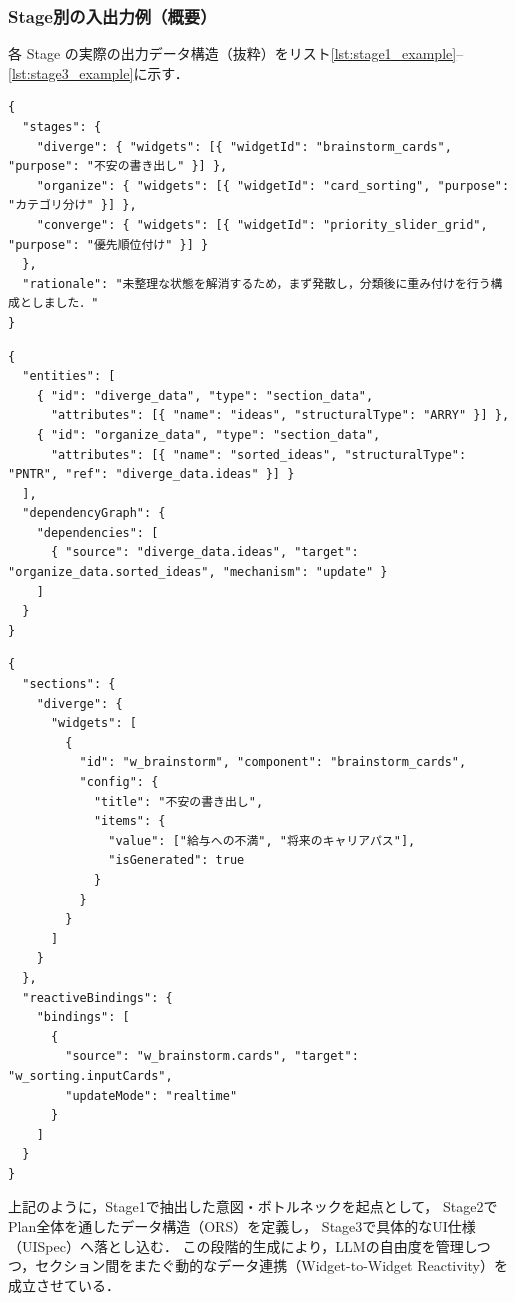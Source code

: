 \documentclass[a4paper,10pt]{jarticle}
\begin{document}
\subsubsection{Stage別の入出力例（概要）}
各 Stage の実際の出力データ構造（抜粋）をリスト\ref{lst:stage1_example}--\ref{lst:stage3_example}に示す．

\begin{lstlisting}[caption = Stage1出力例：WidgetSelectionResult（JSON）, label = lst:stage1_example]
{
  "stages": {
    "diverge": { "widgets": [{ "widgetId": "brainstorm_cards", "purpose": "不安の書き出し" }] },
    "organize": { "widgets": [{ "widgetId": "card_sorting", "purpose": "カテゴリ分け" }] },
    "converge": { "widgets": [{ "widgetId": "priority_slider_grid", "purpose": "優先順位付け" }] }
  },
  "rationale": "未整理な状態を解消するため，まず発散し，分類後に重み付けを行う構成としました．"
}
\end{lstlisting}

\begin{lstlisting}[caption = Stage2出力例：Integrated ORS（JSON）, label = lst:stage2_example]
{
  "entities": [
    { "id": "diverge_data", "type": "section_data", 
      "attributes": [{ "name": "ideas", "structuralType": "ARRY" }] },
    { "id": "organize_data", "type": "section_data",
      "attributes": [{ "name": "sorted_ideas", "structuralType": "PNTR", "ref": "diverge_data.ideas" }] }
  ],
  "dependencyGraph": {
    "dependencies": [
      { "source": "diverge_data.ideas", "target": "organize_data.sorted_ideas", "mechanism": "update" }
    ]
  }
}
\end{lstlisting}

\begin{lstlisting}[caption = Stage3出力例：Integrated UISpec（JSON）, label = lst:stage3_example]
{
  "sections": {
    "diverge": {
      "widgets": [
        {
          "id": "w_brainstorm", "component": "brainstorm_cards",
          "config": {
            "title": "不安の書き出し",
            "items": { 
              "value": ["給与への不満", "将来のキャリアパス"],
              "isGenerated": true
            }
          }
        }
      ]
    }
  },
  "reactiveBindings": {
    "bindings": [
      {
        "source": "w_brainstorm.cards", "target": "w_sorting.inputCards",
        "updateMode": "realtime"
      }
    ]
  }
}
\end{lstlisting}

上記のように，Stage1で抽出した意図・ボトルネックを起点として，
Stage2でPlan全体を通したデータ構造（ORS）を定義し，
Stage3で具体的なUI仕様（UISpec）へ落とし込む．
この段階的生成により，LLMの自由度を管理しつつ，セクション間をまたぐ動的なデータ連携（Widget-to-Widget Reactivity）を成立させている．
\end{document}
